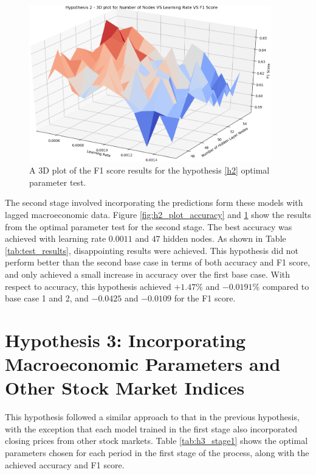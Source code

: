 \documentclass{UoYCSproject}
\begin{document}
\begin{figure}[h]
\includegraphics[width=10.5cm]{h2_f1.png}
\centering
\caption{A 3D plot of the F1 score results for the hypothesis \ref{h2} optimal parameter test.} 
\label{fig:h2_plot_f1}
\end{figure}

The second stage involved incorporating the predictions form these models with lagged macroeconomic data. Figure \ref{fig:h2_plot_accuracy} and \ref{fig:h2_plot_f1} show the results from the optimal parameter test for the second stage. The best accuracy was achieved with learning rate $0.0011$ and $47$ hidden nodes. 
As shown in Table \ref{tab:test_results}, disappointing results were achieved. This hypothesis did not perform better than the second base case in terms of both accuracy and F1 score, and only achieved a small increase in accuracy over the first base case. With respect to accuracy, this hypothesis achieved $+1.47$\% and $-0.0191$\% compared to base case 1 and 2, and  $-0.0425$ and $-0.0109$ for the F1 score.   

\section{Hypothesis 3: Incorporating Macroeconomic Parameters and Other Stock Market Indices}
This hypothesis followed a similar approach to that in the previous hypothesis, with the exception that each model trained in the first stage also incorporated closing prices from other stock markets. Table \ref{tab:h3_stage1} shows the optimal parameters chosen for each period in the first stage of the process, along with the achieved accuracy and F1 score. 
\end{document}

